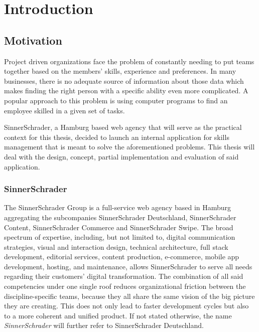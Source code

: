 \chapter{Introduction}

\section{Motivation}
Project driven organizations face the problem of constantly needing to put teams together based on the members’ skills, experience and preferences.
In many businesses, there is no adequate source of information about those data which makes finding the right person with a specific ability even more complicated. A popular approach to this problem is using computer programs to find an employee skilled in a given set of tasks.

SinnerSchrader, a Hamburg based web agency that will serve as the practical context for this thesis, decided to launch an internal application for skills management that is meant to solve the aforementioned problems. This thesis will deal with the design, concept, partial implementation and evaluation of said application.



\subsection{SinnerSchrader}

The SinnerSchrader Group is a full-service web agency based in Hamburg aggregating the subcompanies SinnerSchrader Deutschland, SinnerSchrader Content, SinnerSchrader Commerce and SinnerSchrader Swipe. The broad spectrum of expertise, including, but not limited to, digital communication strategies, visual and interaction design,  technical architecture, full stack development, editorial services, content production, e-commerce, mobile app development, hosting, and maintenance, allows SinnerSchrader to serve all needs regarding their customers' digital transformation. The combination of all said competencies under one single roof reduces organizational friction between the discipline-specific teams, because they all share the same vision of the big picture they are creating. This does not only lead to faster development cycles but also to a more coherent and unified product.
If not stated otherwise, the name \textit{SinnerSchrader} will further refer to SinnerSchrader Deutschland.

\newpage

